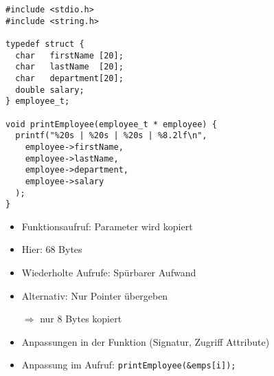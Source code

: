 \begin{frame}[fragile]
%
%
\begin{codebox}[\texttt{structs} in Funktionen, equal height group=GStrPtrXmp2]
\begin{verbatim}
#include <stdio.h>
#include <string.h>

typedef struct {
  char   firstName [20];
  char   lastName  [20];
  char   department[20];
  double salary;
} employee_t;

void printEmployee(employee_t * employee) {
  printf("%20s | %20s | %20s | %8.2lf\n",
    employee->firstName,
    employee->lastName,
    employee->department,
    employee->salary
  );
}
\end{verbatim}
\end{codebox}
%
%
\begin{hintbox}[Optimierung, equal height group=GStrPtrXmp2]
\small
\begin{itemize}
\item Funktionsaufruf: Parameter wird kopiert
\item Hier: 68 Bytes
\item Wiederholte Aufrufe: Spürbarer Aufwand
\item Alternativ: Nur Pointer übergeben
\item[$\Rightarrow$] nur 8 Bytes kopiert
\item Anpassungen in der Funktion (Signatur, Zugriff Attribute)
\item Anpassung im Aufruf: \texttt{printEmployee(&emps[i]);}
\end{itemize}
\end{hintbox}
%
\end{frame}


